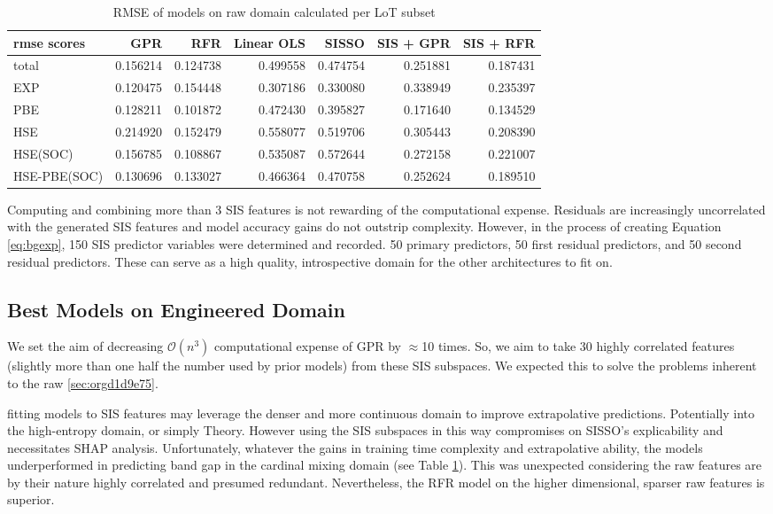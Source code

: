 \begin{table}[htbp]
\caption{\label{tbl:LoTscores} RMSE of models on raw domain calculated per LoT subset}
\centering
\begin{tabular}{lrrrrrr}
rmse scores & GPR & RFR & Linear OLS & SISSO & SIS + GPR & SIS + RFR\\[0pt]
\hline
total & 0.156214 & 0.124738 & 0.499558 & 0.474754 & 0.251881 & 0.187431\\[0pt]
EXP & 0.120475 & 0.154448 & 0.307186 & 0.330080 & 0.338949 & 0.235397\\[0pt]
PBE & 0.128211 & 0.101872 & 0.472430 & 0.395827 & 0.171640 & 0.134529\\[0pt]
HSE & 0.214920 & 0.152479 & 0.558077 & 0.519706 & 0.305443 & 0.208390\\[0pt]
HSE(SOC) & 0.156785 & 0.108867 & 0.535087 & 0.572644 & 0.272158 & 0.221007\\[0pt]
HSE-PBE(SOC) & 0.130696 & 0.133027 & 0.466364 & 0.470758 & 0.252624 & 0.189510\\[0pt]
\end{tabular}
\end{table}

Computing and combining more than 3 SIS features is not rewarding of the computational expense.
Residuals are increasingly uncorrelated with the generated SIS features and model accuracy gains do not outstrip complexity.
However, in the process of creating Equation \ref{eq:bgexp}, 150 SIS predictor variables were determined and recorded.
50 primary predictors, 50 first residual predictors, and 50 second residual predictors.
These can serve as a high quality, introspective domain for the other architectures to fit on.

\subsection{Best Models on Engineered Domain}
\label{sec:org3c8eaf2}
We set the aim of decreasing \(\mathcal{O}(n^3)\) computational expense of GPR by \(\approx\)10 times.
So, we aim to take 30 highly correlated features (slightly more than one half the number used by prior models) from these SIS subspaces.
We expected this to solve the problems inherent to the raw \ref{sec:orgd1d9e75}.

fitting models to SIS features may leverage the denser and more continuous domain to improve extrapolative predictions.
Potentially into the high-entropy domain, or simply Theory.
However using the SIS subspaces in this way compromises on SISSO's explicability and necessitates SHAP analysis.
Unfortunately, whatever the gains in training time complexity and extrapolative ability, the models underperformed in predicting band gap in the cardinal mixing domain (see Table \ref{tbl:LoTscores}).
This was unexpected considering the raw features are by their nature highly correlated and presumed redundant.
Nevertheless, the RFR model on the higher dimensional, sparser raw features is superior.

